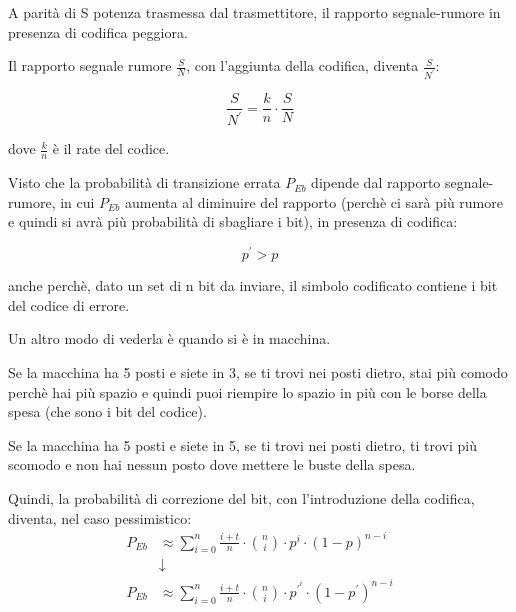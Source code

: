 A parità di S potenza trasmessa dal trasmettitore, 
il rapporto segnale-rumore in presenza di codifica peggiora. \newline 

Il rapporto segnale rumore $\frac{S}{N}$, 
con l'aggiunta della codifica, diventa $\frac{S}{N^{'}}$: 

{
    \Large 
    \begin{equation}
        \frac{S}{N^{'}}
        = 
        \frac{k}{n} \cdot \frac{S}{N}
    \end{equation}
}

dove $\frac{k}{n}$ è il rate del codice. \newline 

Visto che la probabilità di transizione errata $P_{Eb}$ dipende dal rapporto segnale-rumore, 
in cui $P_{Eb}$ aumenta al diminuire del rapporto (perchè ci sarà più rumore e quindi si avrà più probabilità di sbagliare i bit), 
in presenza di codifica: 

{
    \Large 
    \begin{equation}
        p^{'} > p 
    \end{equation}
}

anche perchè, dato un set di n bit da inviare, 
il simbolo codificato contiene i bit del codice di errore. \newline 

\begin{tcolorbox}
    Un altro modo di vederla è quando si è in macchina. \newline 

    Se la macchina ha 5 posti e siete in 3, 
    se ti trovi nei posti dietro, 
    stai più comodo perchè hai più spazio e quindi puoi riempire lo spazio in più con le borse della spesa (che sono i bit del codice). \newline 

    Se la macchina ha 5 posti e siete in 5, 
    se ti trovi nei posti dietro, 
    ti trovi più scomodo e non hai nessun posto dove mettere le buste della spesa. 
\end{tcolorbox}


Quindi, la probabilità di correzione del bit, con l'introduzione della codifica, diventa, 
nel caso pessimistico: 
{
    \Large 
    \begin{equation}
        \begin{split}
            P_{Eb}
            &\approx
         \sum_{i = 0}^{n}
         \frac{i+t}{n}
        \cdot 
        \binom{n}{i} \cdot p^{i} \cdot (1 - p)^{n-i}
        \\
        &\downarrow
        \\
        P_{Eb}
            &\approx
         \sum_{i = 0}^{n}
         \frac{i+t}{n}
        \cdot 
        \binom{n}{i} \cdot p^{'^{i}} \cdot (1 - p^{'})^{n-i}
    \end{split}
    \end{equation}
}

